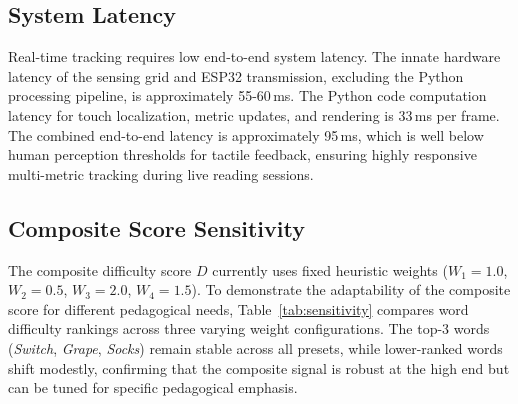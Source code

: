 \documentclass[conference]{IEEEtran}
\begin{document}
    \subsection{System Latency}
    
    Real-time tracking requires low end-to-end system latency. The innate hardware latency of the sensing grid and ESP32 transmission, excluding the Python processing pipeline, is approximately 55-60\,ms. The Python code computation latency for touch localization, metric updates, and rendering is 33\,ms per frame. The combined end-to-end latency is approximately 95\,ms, which is well below human perception thresholds for tactile feedback, ensuring highly responsive multi-metric tracking during live reading sessions.

    \vspace{-4mm}
\subsection{Composite Score Sensitivity}

    The composite difficulty score $D$ currently uses fixed heuristic weights ($W_1{=}1.0$, $W_2{=}0.5$, $W_3{=}2.0$, $W_4{=}1.5$). To demonstrate the adaptability of the composite score for different pedagogical needs, Table~\ref{tab:sensitivity} compares word difficulty rankings across three varying weight configurations. The top-3 words (\textit{Switch}, \textit{Grape}, \textit{Socks}) remain stable across all presets, while lower-ranked words shift modestly, confirming that the composite signal is robust at the high end but can be tuned for specific pedagogical emphasis.

    \begin{table}[!htp]
    \vspace{-4mm}
    \caption{Sensitivity Analysis: Top-7 Word Difficulty Rankings Under Three Weight Presets}
    \vspace{-6mm}
    \label{tab:sensitivity}
    \begin{center}
    \end{center}
    \vspace{-6mm}
    \end{table}
\end{document}
